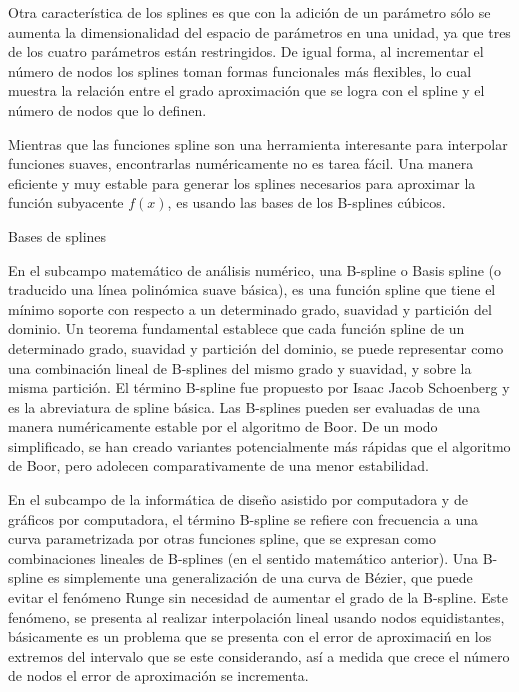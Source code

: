 \vspace{0.5cm}

\hspace{0.4cm} Otra caracter\'istica de los splines es que con la adici\'on de un par\'ametro s\'olo se aumenta la dimensionalidad del espacio de par\'ametros en una unidad, ya que tres de los cuatro par\'ametros est\'an restringidos. De igual forma, al incrementar el n\'umero de nodos los splines toman formas funcionales m\'as flexibles, lo cual muestra la relaci\'on entre el grado aproximaci\'on que se logra con el spline y el n\'umero de nodos que lo definen.

\vspace{0.5cm}

\hspace{0.4cm} Mientras que las funciones spline son una herramienta interesante para interpolar funciones suaves, encontrarlas num\'ericamente no es tarea f\'acil. Una manera eficiente y muy estable para generar los splines necesarios para aproximar la funci\'on subyacente $f(x)$, es usando las bases de los B-splines c\'ubicos.

\vspace{0.5cm}

Bases de splines

\hspace{0.4cm} En el subcampo matem\'atico de an\'alisis num\'erico, una B-spline o Basis spline (o traducido una l\'inea polin\'omica suave b\'asica), es una funci\'on spline que tiene el m\'inimo soporte con respecto a un determinado grado, suavidad y partici\'on del dominio. Un teorema fundamental establece que cada funci\'on spline de un determinado grado, suavidad y partici\'on del dominio, se puede representar como una combinaci\'on lineal de B-splines del mismo grado y suavidad, y sobre la misma partici\'on. El t\'ermino B-spline fue propuesto por Isaac Jacob Schoenberg y es la abreviatura de spline b\'asica. Las B-splines pueden ser evaluadas de una manera num\'ericamente estable por el algoritmo de Boor. De un modo simplificado, se han creado variantes potencialmente m\'as r\'apidas que el algoritmo de Boor, pero adolecen comparativamente de una menor estabilidad.

\hspace{0.4cm} En el subcampo de la inform\'atica de dise\~no asistido por computadora y de gr\'aficos por computadora, el t\'ermino B-spline se refiere con frecuencia a una curva parametrizada por otras funciones spline, que se expresan como combinaciones lineales de B-splines (en el sentido matem\'atico anterior). Una B-spline es simplemente una generalizaci\'on de una curva de B\'ezier, que puede evitar el fen\'omeno Runge sin necesidad de aumentar el grado de la B-spline. Este fen\'omeno, se presenta al realizar interpolaci\'on lineal usando nodos equidistantes, b\'asicamente es un problema que se presenta con el error de aproximaci\'n en los extremos del intervalo que se este considerando, as\'i a medida que crece el n\'umero de nodos el error de aproximaci\'on se incrementa. 


